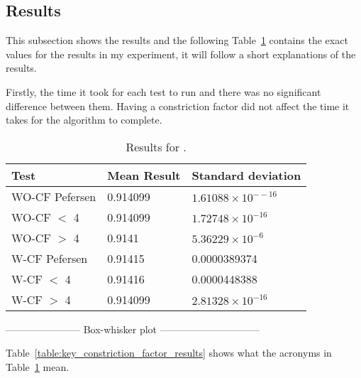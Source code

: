     \subsection{Results} %
    \label{sub:results}
      This subsection shows the results and the following Table~\ref{table:constriction_factor_results} contains the exact values for the results in my experiment, it will follow a short explanations of the results. 

      Firstly, the time it took for each test to run and there was no significant difference between them. Having a constriction factor did not affect the time it takes for the algorithm to complete. 

        \begin{table}[H]
          \setlength{\extrarowheight}{2.0pt}
          \begin{tabular}{|l|l|l|}
            \hline
            Test & Mean Result & Standard deviation \\
            \hline
            WO-CF Pefersen & 0.914099 & $1.61088\times10^{--16}$ \\
            \hline
            WO-CF $<$ 4 & 0.914099 & $1.72748\times10^{-16}$ \\
            \hline
            WO-CF $>$ 4 & 0.9141 & $5.36229\times10^{-6}$ \\
            \hline
            W-CF Pefersen & 0.91415 & 0.0000389374 \\
            \hline
            W-CF $<$ 4 & 0.91416 & 0.0000448388 \\
            \hline
            W-CF $>$ 4 & 0.914099 & $2.81328\times10^{-16}$ \\
            \hline
          \end{tabular}
          \caption{Results for .}
          \label{table:constriction_factor_results}
        \end{table}

      ----------------------- Box-whisker plot ------------------------------

      Table~\ref{table:key_constriction_factor_results} shows what the acronyms in Table~\ref{table:constriction_factor_results} mean. 

